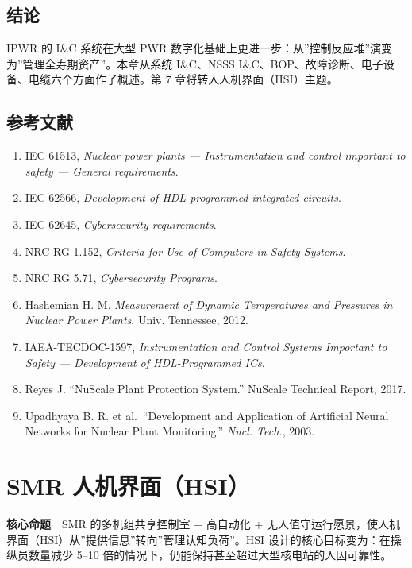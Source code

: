 \documentclass[
  UTF8,
  scheme=plain,
  fontsize=10pt,
  openany
]{ctexbook}
\begin{document}
\section{结论}\label{ux7ed3ux8bba-3}

IPWR 的 I\&C 系统在大型 PWR
数字化基础上更进一步：从''控制反应堆''演变为''管理全寿期资产''。本章从系统
I\&C、NSSS I\&C、BOP、故障诊断、电子设备、电缆六个方面作了概述。第 7
章将转入人机界面（HSI）主题。

\section{参考文献}\label{ux53c2ux8003ux6587ux732e-5}

\begin{enumerate}
\def\labelenumi{\arabic{enumi}.}
\tightlist
\item
  IEC 61513, \emph{Nuclear power plants --- Instrumentation and control
  important to safety --- General requirements}.
\item
  IEC 62566, \emph{Development of HDL-programmed integrated circuits}.
\item
  IEC 62645, \emph{Cybersecurity requirements}.
\item
  NRC RG 1.152, \emph{Criteria for Use of Computers in Safety Systems}.
\item
  NRC RG 5.71, \emph{Cybersecurity Programs}.
\item
  Hashemian H. M. \emph{Measurement of Dynamic Temperatures and
  Pressures in Nuclear Power Plants}. Univ. Tennessee, 2012.
\item
  IAEA-TECDOC-1597, \emph{Instrumentation and Control Systems Important
  to Safety --- Development of HDL-Programmed ICs}.
\item
  Reyes J. ``NuScale Plant Protection System.'' NuScale Technical
  Report, 2017.
\item
  Upadhyaya B. R. et al.~``Development and Application of Artificial
  Neural Networks for Nuclear Plant Monitoring.'' \emph{Nucl. Tech.},
  2003.
\end{enumerate}

\cleardoublepage

\chapter{SMR 人机界面（HSI）}\label{smr-ux4ebaux673aux754cux9762hsi}

\begin{epigraph}

\textbf{核心命题}　SMR 的多机组共享控制室 + 高自动化 +
无人值守运行愿景，使人机界面（HSI）从''提供信息''转向''管理认知负荷''。HSI
设计的核心目标变为：在操纵员数量减少 5--10
倍的情况下，仍能保持甚至超过大型核电站的人因可靠性。

\end{epigraph}
\end{document}
